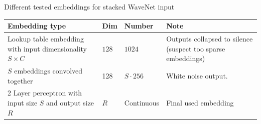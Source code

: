\documentclass[
  ignorenonframetext,
  aspectratio=169,
]{beamer}
\begin{document}
\begin{frame}{Different tested embeddings for stacked WaveNet input}
\protect\hypertarget{different-tested-embeddings-for-stacked-wavenet-input}{}
\begin{longtable}[]{@{}llll@{}}
\toprule
\begin{minipage}[b]{0.39\columnwidth}\raggedright
Embedding type\strut
\end{minipage} & \begin{minipage}[b]{0.03\columnwidth}\raggedright
Dim\strut
\end{minipage} & \begin{minipage}[b]{0.08\columnwidth}\raggedright
Number\strut
\end{minipage} & \begin{minipage}[b]{0.39\columnwidth}\raggedright
Note\strut
\end{minipage}\tabularnewline
\midrule
\endhead
\begin{minipage}[t]{0.39\columnwidth}\raggedright
Lookup table embedding with input dimensionality \(S\times C\)\strut
\end{minipage} & \begin{minipage}[t]{0.03\columnwidth}\raggedright
\(128\)\strut
\end{minipage} & \begin{minipage}[t]{0.08\columnwidth}\raggedright
\(1024\)\strut
\end{minipage} & \begin{minipage}[t]{0.39\columnwidth}\raggedright
Outputs collapsed to silence (suspect too sparse embeddings)\strut
\end{minipage}\tabularnewline
\begin{minipage}[t]{0.39\columnwidth}\raggedright
\(S\) embeddings convolved together\strut
\end{minipage} & \begin{minipage}[t]{0.03\columnwidth}\raggedright
128\strut
\end{minipage} & \begin{minipage}[t]{0.08\columnwidth}\raggedright
\(S\cdot 256\)\strut
\end{minipage} & \begin{minipage}[t]{0.39\columnwidth}\raggedright
White noise output.\strut
\end{minipage}\tabularnewline
\begin{minipage}[t]{0.39\columnwidth}\raggedright
2 Layer perceptron with input size \(S\) and output size \(R\)\strut
\end{minipage} & \begin{minipage}[t]{0.03\columnwidth}\raggedright
\(R\)\strut
\end{minipage} & \begin{minipage}[t]{0.08\columnwidth}\raggedright
Continuous\strut
\end{minipage} & \begin{minipage}[t]{0.39\columnwidth}\raggedright
Final used embedding\strut
\end{minipage}\tabularnewline
\bottomrule
\end{longtable}
\end{frame}
\end{document}
